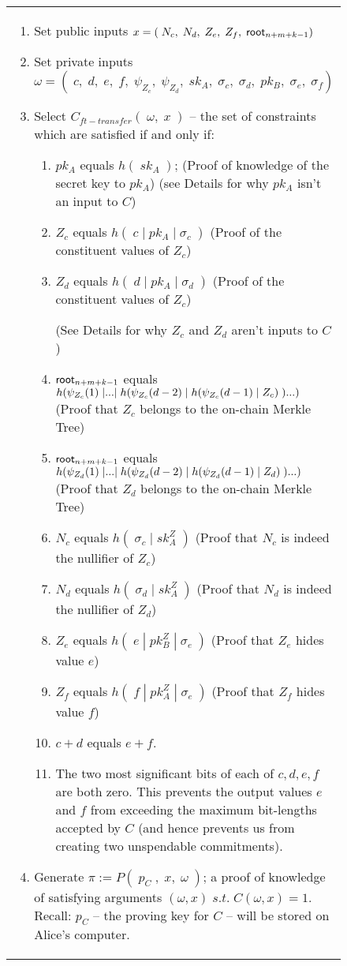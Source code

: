 \begin{figure}[htp]
\begin{center}
\begin{framed}
{\begin{tabular}{p{16cm}}
\begin{enumerate}
          \item Set public inputs $x = (\;N_c,\;N_d,\;Z_e,\;Z_f,\;\mathsf{root}_{n+m+k-1})$
          \item Set private inputs $\omega = (\;c,\;d,\;e,\;f,\;\psi_{Z_c},\;\psi_{Z_d},\;sk_A,\;\sigma_c,\;\sigma_d,\;pk_B,\;\sigma_e,\;\sigma_f)$
          \item Select $C_{ft-transfer}(\;\omega,\;x\;)$ -- the set of constraints which are satisfied if and only if:
          \begin{enumerate}
            \item $pk_A$ equals $h(\;sk_A\;)$; (Proof of knowledge of the secret key to $pk_A$) (see Details for why $pk_A$ isn't an input to $C$)
            \item $Z_c$ equals $h(\;c\;|\;pk_A\;|\;\sigma_c\;)$ (Proof of the constituent values of $Z_c$)
            \item $Z_d$ equals $h(\;d\;|\;pk_A\;|\;\sigma_d\;)$ (Proof of the constituent values of $Z_c$)
            
            (See Details for why $Z_c$ and $Z_d$ aren't inputs to $C$)
            \item $\mathsf{root}_{n+m+k-1}$ equals $h\br*{\psi_{Z_c}(1)\;|...|\;h\br*{\psi_{Z_c}(d-2)\;|\;h\br*{\psi_{Z_c}(d-1)\;|\;Z_c}\;}...}$ (Proof that $Z_c$ belongs to the on-chain Merkle Tree)
            \item $\mathsf{root}_{n+m+k-1}$ equals $h\br*{\psi_{Z_d}(1)\;|...|\;h\br*{\psi_{Z_d}(d-2)\;|\;h\br*{\psi_{Z_d}(d-1)\;|\;Z_d}\;}...}$ (Proof that $Z_d$ belongs to the on-chain Merkle Tree)
            \item $N_c$ equals $h(\;\sigma_c\;|\;sk^Z_A\;)$ (Proof that $N_c$ is indeed the nullifier of $Z_c$)
            \item $N_d$ equals $h(\;\sigma_d\;|\;sk^Z_A\;)$ (Proof that $N_d$ is indeed the nullifier of $Z_d$)
            \item $Z_e$ equals $h(\;e\;|\;pk^Z_B\;|\;\sigma_e\;)$ (Proof that $Z_e$ hides value $e$)
            \item $Z_f$ equals $h(\;f\;|\;pk^Z_A\;|\;\sigma_e\;)$ (Proof that $Z_f$ hides value $f$)
            \item $c + d$ equals $e + f$.
            \item The two most significant bits of each of $c, d, e, f$ are both zero. This prevents the output values $e$ and $f$ from exceeding the maximum bit-lengths accepted by $C$ (and hence prevents us from creating two unspendable commitments).
          \end{enumerate}
          \item Generate $\pi := P(\;p_C\;,\;x,\;\omega\;)$; a proof of knowledge of satisfying arguments $(\omega, x)\;s.t.\;C(\omega, x) = 1$. Recall: $p_C$ -- the proving key for $C$ -- will be stored on Alice's computer.
           

\end{enumerate}
\end{tabular}}
\end{framed}
\end{center}
\end{figure}
